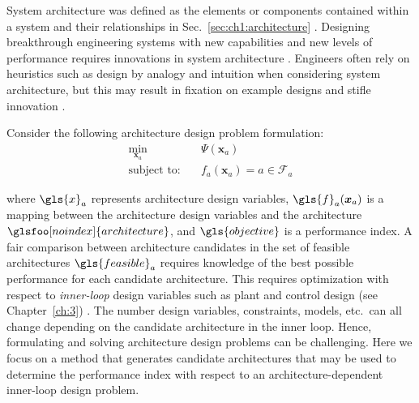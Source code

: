 System architecture was defined as the elements or components contained within a system and their relationships in Sec.~\ref{sec:ch1:architecture} \cite{Crawley2004a, Mittal1989a, Wyatt2014a}. 
Designing breakthrough engineering systems with new capabilities and new levels of performance requires innovations in system architecture \cite{Cagan2005a, Chakrabarti2011a}.
Engineers often rely on heuristics such as design by analogy \cite{Chan2011a} and intuition when considering system architecture, but this may result in fixation on example designs and stifle innovation \cite{Linsey2010a}. 

Consider the following architecture design problem formulation:
\begin{subequations}
\label{eq:ch2:arch_outerloop}
\begin{align}
\min_{\bm{x}_a} \quad & \Psi(\bm{x}_a) \\
\text{subject to:} \quad & f_a(\bm{x}_a) = a \in \mathcal{F}_a
\end{align}
\end{subequations}

\noindent where $\gls{x}_{a}$ represents architecture design variables, $\gls{f}_a(\bm{x}_a)$ is a mapping between the architecture design variables and the architecture $\glsfoo[noindex]{architecture}$, and $\gls{objective}$ is a performance index. A fair comparison between architecture candidates in the set of feasible architectures $\gls{feasible}_a$ requires knowledge of the best possible performance for each candidate architecture. This requires optimization with respect to \textit{inner-loop} design variables such as plant and control design (see Chapter~\ref{ch:3}) \cite{Deshmukh2015a, Herber2017b}. The number design variables, constraints, models, etc.~can all change depending on the candidate architecture in the inner loop. Hence, formulating and solving architecture design problems can be challenging. Here we focus on a method that generates candidate architectures that may be used to determine the performance index with respect to an architecture-dependent inner-loop design problem.

